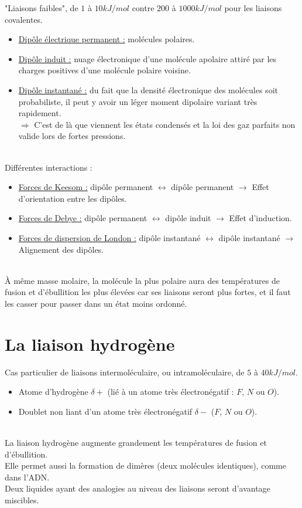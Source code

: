 \documentclass[13pt, twoside, a4paper, french, tikz]{report}
\begin{document}
    "Liaisons faibles", de $1$ à $10 kJ/mol$ contre $200$ à $1000 kJ/mol$ pour les liaisons covalentes.
    \begin{itemize}
      \item \underline{Dipôle électrique permanent :} molécules polaires.
      \item \underline{Dipôle induit :} nuage électronique d'une molécule apolaire attiré par les charges positives d'une molécule polaire voisine.
      \item \underline{Dipôle instantané :} du fait que la densité électronique des molécules soit probabiliste, il peut y avoir un léger moment dipolaire variant très rapidement.\\
      $\Rightarrow$ C'est de là que viennent les états condensés et la loi des gaz parfaits non valide lors de fortes pressions.
    \end{itemize}
    \vspace{5pt}\\
    Différentes interactions :
    \begin{itemize}
      \item \underline{Forces de Keesom :} dipôle permanent $\leftrightarrow$ dipôle permanent $\rightarrow$ Effet d'orientation entre les dipôles.
      \item \underline{Forces de Debye :} dipôle permanent $\leftrightarrow$ dipôle induit $\rightarrow$ Effet d'induction.
      \item \underline{Forces de dispersion de London :} dipôle instantané $\leftrightarrow$ dipôle instantané $\rightarrow$ Alignement des dipôles.
    \end{itemize}
    \ \\
    À même masse molaire, la molécule la plus polaire aura des températures de fusion et d'ébullition les plus élevées car ses liaisons seront plus fortes, et il faut les casser pour passer dans un état moins ordonné.
  
  
  \section{La liaison hydrogène}\label{sec:la-liaison-hydrogene}
    
    Cas particulier de liaisons intermoléculaire, ou intramoléculaire, de $5$ à $40 kJ/mol$.
    \begin{itemize}
      \item Atome d'hydrogène $\delta +$ (lié à un atome très électronégatif : $F$, $N$ ou $O$).
      \item Doublet non liant d'un atome très électronégatif $\delta -$ ($F$, $N$ ou $O$).
    \end{itemize}
    \ \\
    La liaison hydrogène augmente grandement les températures de fusion et d'ébullition.\\
    Elle permet aussi la formation de dimères (deux molécules identiques), comme dans l'ADN.\\
    Deux liquides ayant des analogies au niveau des liaisons seront d'avantage miscibles.
  
\end{document}
